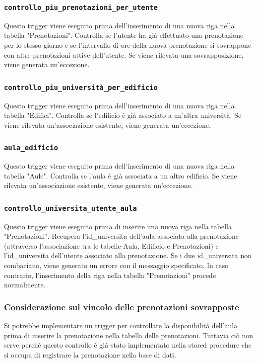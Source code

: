 \documentclass[a4paper, 10pt, oneside]{article} %
\begin{document}
\subsubsection*{\texttt{controllo\_piu\_prenotazioni\_per\_utente}}

Questo trigger viene eseguito prima dell'inserimento di una nuova riga nella tabella "Prenotazioni". Controlla se l'utente ha già effettuato una prenotazione per lo stesso giorno e se l'intervallo di ore della nuova prenotazione si sovrappone con altre prenotazioni attive dell'utente. Se viene rilevata una sovrapposizione, viene generata un'eccezione.


\subsubsection*{\texttt{controllo\_piu\_università\_per\_edificio}}
Questo trigger viene eseguito prima dell'inserimento di una nuova riga nella tabella "Edifici". Controlla se l'edificio è già associato a un'altra università. Se viene rilevata un'associazione esistente, viene generata un'eccezione.

\subsubsection*{\texttt{aula\_edificio}}

Questo trigger viene eseguito prima dell'inserimento di una nuova riga nella tabella "Aule". Controlla se l'aula è già associata a un altro edificio. Se viene rilevata un'associazione esistente, viene generata un'eccezione.

\subsubsection*{\texttt{controllo\_universita\_utente\_aula}}

Questo trigger viene eseguito prima di inserire una nuova riga nella tabella "Prenotazioni". Recupera l'id\_universita dell'aula associata alla prenotazione (attraverso l'associazione tra le tabelle Aula, Edificio e Prenotazioni) e l'id\_universita dell'utente associato alla prenotazione. Se i due id\_universita non combaciano, viene generato un errore con il messaggio specificato. In caso contrario, l'inserimento della riga nella tabella "Prenotazioni" procede normalmente.

\subsubsection*{Considerazione sul vincolo delle prenotazioni sovrapposte}
Si potrebbe implementare un trigger per controllare la disponibilità dell'aula prima di inserire la prenotazione nella tabella delle prenotazioni. Tuttavia ciò non serve perché questo controllo è già stato implementato nella stored procedure che si occupa di registrare la prenotazione nella base di dati.
\end{document}
